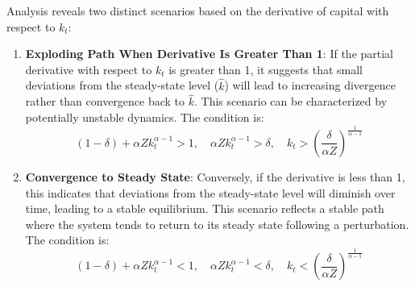 \documentclass[12pt]{report}
\begin{document}
Analysis reveals two distinct scenarios based on the derivative of capital with respect to \(k_{t}\):
\begin{enumerate}
    \item \textbf{Exploding Path When Derivative Is Greater Than 1}: If the partial derivative with respect to \(k_{t}\) is greater than 1, it suggests that small deviations from the
    steady-state level (\(\widehat{k}\)) will lead to increasing divergence rather than convergence back to
    \(\widehat{k}\). This scenario can be characterized by potentially unstable dynamics. The condition is:
    \[
    (1-\delta) + \alpha Z k_{t}^{\alpha-1} > 1, \quad \alpha Z k_{t}^{\alpha-1} > \delta, \quad k_{t} > \left(\frac{\delta}{\alpha Z}\right)^{\frac{1}{\alpha - 1}}
    \]

    \item \textbf{Convergence to Steady State}: Conversely, if the derivative is less than 1, this indicates
    that deviations from the steady-state level will
    diminish over time, leading to a stable equilibrium. This scenario reflects a stable path where the system tends to
    return to its steady state following a perturbation.   The condition is:
    \[
    (1-\delta) + \alpha Z k_{t}^{\alpha-1} < 1, \quad \alpha Z k_{t}^{\alpha-1} < \delta, \quad k_{t} < \left(\frac{\delta}{\alpha Z}\right)^{\frac{1}{\alpha - 1}}
    \]

\end{enumerate}
\end{document}
